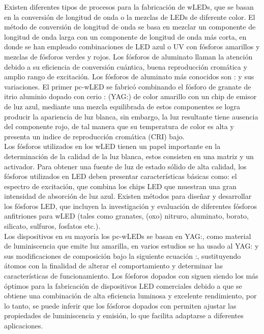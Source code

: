 Existen diferentes tipos de procesos para la fabricación de wLEDs, que se basan 
en la conversión de longitud de onda o la mezclas de LEDs de diferente color. El
método de conversión de longitud de onda se basa en mezclar un componente de longitud 
de onda larga con un componente de longitud de onda más corta, en donde se han empleado 
combinaciones de LED azul o UV con fósforos amarillos y mezclas de fósforos verdes
y rojos. Los fósforos de aluminato llaman la atención debido a su eficiencia de
conversión cuántica, buena reproducción cromática y amplio rango de excitación.
Los fósforos de aluminato más conocidos son : y sus
variaciones. El primer pc-wLED se fabricó combinando el fósforo de granate de itrio
aluminio dopado con cerio : (YAG:) 
de color amarillo 
con un chip de  emisor de luz azul, mediante una mezcla equilibrada
de estos componentes se logra producir la apariencia de luz blanca, sin embargo,
la luz resultante tiene ausencia del componente rojo, de tal manera que su
temperatura de color es alta y presenta un indice de reproducción cromática 
(CRI) bajo\cite{Sustentable2014,Li2005,khanna2014}.\\

Los fósforos utilizados en los wLED tienen un papel importante en la
determinación de la calidad de la luz blanca, estos consisten en una matriz y
un activador. Para obtener una fuente de luz de estado sólido de alta calidad,
los fósforos utilizados en LED deben presentar características básicas como: el
espectro de excitación, que combina los chips LED que muestran una gran
intensidad de absorción de luz azul. Existen métodos para diseñar y desarrollar
los fósforos LED, que incluyen la investigación y evaluación de diferentes
fósforos anfitriones para wLED  (tales como granates, (oxo) nitruro,
aluminato, borato, silicato, sulfuros, fosfatos etc.)\cite{Li2005}.\\

Los dispositivos en su mayoría los pc-wLEDs se basan en YAG:, 
como material
de luminiscencia que emite luz amarilla, en varios estudios se ha usado
al YAG: y sus modificaciones de composición bajo la siguiente ecuación
:, sustituyendo átomos con la finalidad
de alterar el comportamiento y determinar las características de funcionamiento. 
Los fósforos dopados con  siguen siendo los más óptimos para la 
fabricación de
dispositivos LED comerciales debido a que se obtiene una combinación de alta
eficiencia luminosa y excelente rendimiento, por lo tanto, se puede inferir que 
los fósforos dopados con  permiten ajustar las propiedades de 
luminiscencia y emisión, lo que facilita adaptarse a diferentes aplicaciones\cite{Ahn2017}.\\

